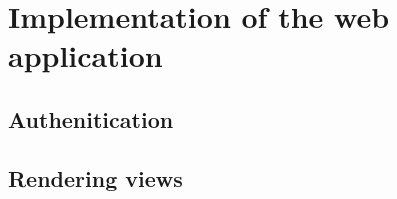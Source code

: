 \chapter{Implementation of the web application}
\section{Authenitication}
\section{Rendering views}
